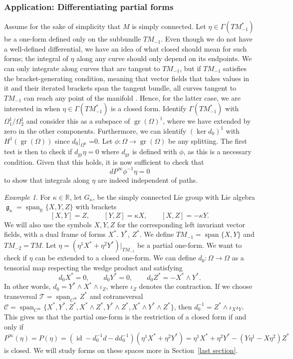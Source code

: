 \documentclass[10pt]{amsart}
\newcounter{dummy} \numberwithin{dummy}{section}
\theoremstyle{remark}
\newtheorem{example}[dummy]{Example}
\newcommand{\calT}{\mathcal{T}}
\newcommand{\calC}{\mathcal{C}}
\DeclareMathOperator{\id}{id}
\DeclareMathOperator{\spn}{span}
\DeclareMathOperator{\frakg}{\mathfrak{g}}
\DeclareMathOperator{\gr}{gr}
\numberwithin{equation}{section}
\begin{document}
\subsubsection{Application: Differentiating partial forms} \label{sec:Application} Assume for the sake of simplicity that $M$ is simply connected. Let $\eta \in \Gamma(TM_{-1}^*)$ be a one-form defined only on the subbundle $TM_{-1}$. Even though we do not have a well-defined differential, we have an idea of what closed should mean for such forms; the integral of $\eta$ along any curve should only depend on its endpoints. We can only integrate along curves that are tangent to $TM_{-1}$, but if $TM_{-1}$ satisfies the bracket-generating condition, meaning that vector fields that takes values in it and their iterated brackets span the tangent bundle, all curves tangent to $TM_{-1}$ can reach any point of the manifold \cite{Ras38,Cho39}. Hence, for the latter case, we are interested in when $\eta \in \Gamma(TM_{-1}^*)$ is a closed form. Identify $\Gamma(TM_{-1}^*)$ with $\Omega^1_1/\Omega^1_2$ and consider this as a subspace of $\gr(\Omega)^1$, where we have extended by zero in the other components. Furthermore, we can identify $(\ker d_0)^1$ with $H^1(\gr(\Omega))$ since $d_0|_{\Omega^0}$ =0. Let $\phi:\Omega \to \gr(\Omega)$ be any splitting. The first test is then to check if $d_{\gr} \eta =0$ where $d_{\gr}$ is defined with $\phi$, as this is a necessary condition. Given that this holds, it is now sufficient to check that
$$dP^\infty\phi^{-1} \eta =0$$
to show that integrals along $\eta$ are indeed independent of paths.

\begin{example}
For $\kappa \in \mathbb{R}$, let $G_\kappa$, be the simply connected Lie group with Lie algebra $\frakg_\kappa = \spn_{\mathbb{R}} \{ X, Y, Z \}$ with brackets
$$[X,Y] = Z, \qquad [Y,Z] = \kappa X, \qquad [X,Z] = -\kappa Y.$$
We will also use the symbols $X, Y, Z$ for the corresponding left invariant vector fields, with a dual frame of forms $X^*$. $Y^*$, $Z^*$. We define $TM_{-1} = \spn \{ X,Y\}$ and $TM_{-2} = TM$. Let $\eta = (\eta^1 X^* + \eta^2 Y^*)|_{TM_{-1}}$ be a partial one-form. We want to check if $\eta$ can be extended to a closed one-form. We can define $d_0: \Omega \to \Omega$ as a tensorial map respecting the wedge product and satisfying
$$d_0 X^* = 0, \qquad d_0 Y^* = 0, \qquad d_0Z^* = - X^* \wedge Y^*.$$
In other words, $d_0 = Y^* \wedge X^* \wedge \iota_Z$, where $\iota_Z$ denotes the contraction. If we choose transversal $\calT = \spn_{C^\infty} Z^*$ and cotransversal $\calC = \spn_{C^\infty} \{ X^*, Y^*, Z^*, X^* \wedge Z^*, Y^* \wedge Z^*, X^* \wedge Y^* \wedge Z^*\}$, then $d_0^{-1} = Z^* \wedge \iota_X \iota_Y$. This gives us that the partial one-form is the restriction of a closed form if and only if
$$P^\infty(\eta) = P(\eta) = (\id - d^{-1}_0 d - d d_0^{-1})(\eta^1 X^* + \eta^2 Y^*) = \eta^1 X^* + \eta^2 Y^* - (Y\eta^1 - X\eta^2) Z^* $$
is closed. We will study forms on these spaces more in Section~\ref{last section}.
\end{example}
\end{document}
